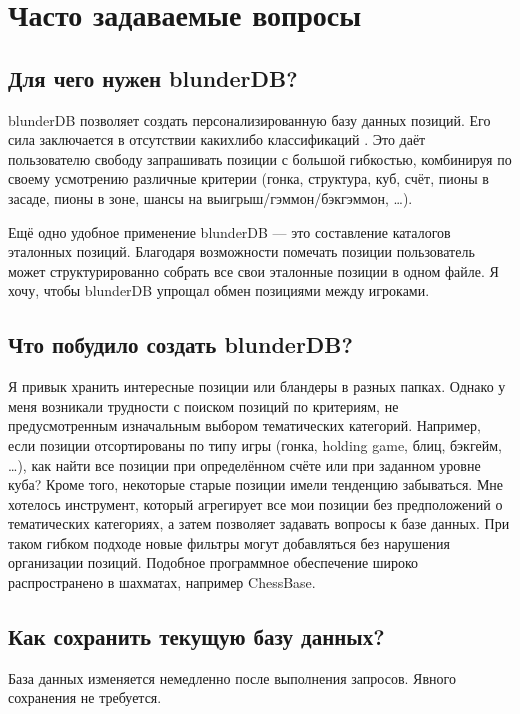 \documentclass[letterpaper,10pt,russian]{sphinxmanual}
\begin{document}
\sphinxstepscope


\section{Часто задаваемые вопросы}
\label{\detokenize{faq:foire-aux-questions}}\label{\detokenize{faq:faq}}\label{\detokenize{faq::doc}}

\subsection{Для чего нужен blunderDB?}
\label{\detokenize{faq:quel-est-l-utilite-de-blunderdb}}
\sphinxAtStartPar
blunderDB позволяет создать персонализированную базу данных позиций. Его сила заключается в отсутствии каких\sphinxhyphen{}либо классификаций . Это даёт пользователю свободу запрашивать позиции с большой гибкостью, комбинируя по своему усмотрению различные критерии (гонка, структура, куб, счёт, пионы в засаде, пионы в зоне, шансы на выигрыш/гэммон/бэкгэммон, …).

\sphinxAtStartPar
Ещё одно удобное применение blunderDB — это составление каталогов эталонных позиций. Благодаря возможности помечать позиции пользователь может структурированно собрать все свои эталонные позиции в одном файле. Я хочу, чтобы blunderDB упрощал обмен позициями между игроками.


\subsection{Что побудило создать blunderDB?}
\label{\detokenize{faq:qu-est-ce-qui-a-motive-la-creation-de-blunderdb}}
\sphinxAtStartPar
Я привык хранить интересные позиции или бландеры в разных папках. Однако у меня возникали трудности с поиском позиций по критериям, не предусмотренным изначальным выбором тематических категорий. Например, если позиции отсортированы по типу игры (гонка, holding game, блиц, бэкгейм, …), как найти все позиции при определённом счёте или при заданном уровне куба? Кроме того, некоторые старые позиции имели тенденцию забываться. Мне хотелось инструмент, который агрегирует все мои позиции без предположений  о тематических категориях, а затем позволяет задавать вопросы к базе данных. При таком гибком подходе новые фильтры могут добавляться без нарушения организации позиций. Подобное программное обеспечение широко распространено в шахматах, например ChessBase.


\subsection{Как сохранить текущую базу данных?}
\label{\detokenize{faq:comment-sauvegarder-la-base-de-donnees-courante}}
\sphinxAtStartPar
База данных изменяется немедленно после выполнения запросов. Явного сохранения не требуется.
\end{document}
